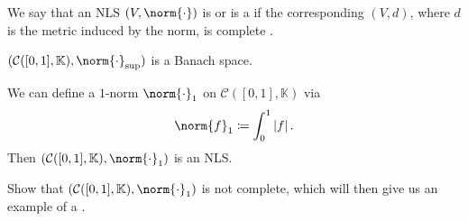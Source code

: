 \documentclass[notoc,notitlepage]{tufte-book}
\begin{document}
\begin{defn}\label{defn:banach_space}
  We say that an NLS $(V, \norm{\cdot})$ is  or is a
   if the corresponding $(V, d)$, where $d$ is the metric
  induced by the norm, is complete .
\end{defn}

\begin{eg}
  $(\mathcal{C}([0, 1], \mathbb{K}), \norm{\cdot}_{\sup})$ is a Banach space.
\end{eg}

\begin{eg}
  We can define a $1$-norm $\norm{\cdot}_1$ on $\mathcal{C}([0, 1], \mathbb{K})$ 
  via
  \begin{equation*}
    \norm{f}_1 \coloneqq \int_{0}^{1} \abs{f}.
  \end{equation*}
  Then $(\mathcal{C}([0, 1], \mathbb{K}), \norm{\cdot}_1)$ is an NLS.
\end{eg}

\begin{ex}
  Show that $(\mathcal{C}([0, 1], \mathbb{K}), \norm{\cdot}_1)$ is not
  complete, which will then give us an example of a .
\end{ex}
\end{document}
